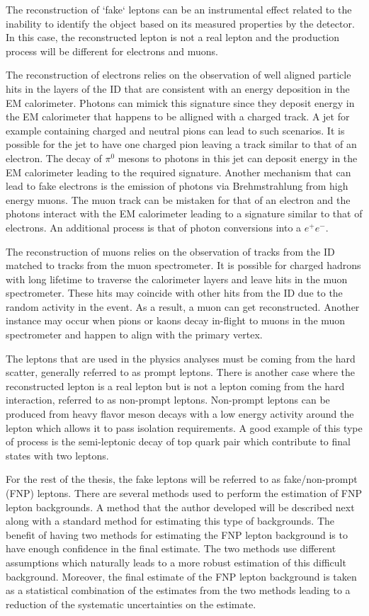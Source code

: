 The reconstruction of `fake` leptons can be an instrumental effect related to the inability to identify the object based on 
its measured properties by the detector. In this case, the reconstructed lepton is not a real lepton and the production process 
will be different for electrons and muons.

The reconstruction of electrons relies on the observation of well aligned particle hits in the layers of the ID that are consistent 
with an energy deposition in the EM calorimeter. Photons can mimick this signature since they deposit energy in the EM 
calorimeter that happens to be alligned with a charged track. A jet for example containing charged and neutral pions can 
lead to such scenarios. It is possible for the jet to have one charged pion leaving a track similar to that of an electron.
The decay of $\pi^0$ mesons to photons in this jet can deposit energy in the EM calorimeter leading to the required signature.
Another mechanism that can lead to fake electrons is the emission of photons via Brehmstrahlung from high energy muons. 
The muon track can be mistaken for that of an electron and the photons interact with the EM calorimeter leading to a
signature similar to that of electrons. An additional process is that of photon conversions into a $e^+e^-$.

The reconstruction of muons relies on the observation of tracks from the ID matched to tracks from the muon spectrometer.
It is possible for charged hadrons with long lifetime to traverse the calorimeter layers and leave hits in the muon spectrometer.
These hits may coincide with other hits from the ID due to the random activity in the event. As a result, a muon can get
reconstructed. Another instance may occur when pions or kaons decay in-flight to muons in the muon spectrometer
and happen to align with the primary vertex.

The leptons that are used in the physics analyses must be coming from the hard scatter, generally referred to as prompt leptons.
There is another case where the reconstructed lepton is a real lepton but is not a lepton coming from the hard interaction,
referred to as non-prompt leptons. Non-prompt leptons can be produced from heavy flavor meson decays with a low energy activity 
around the lepton which allows it to pass isolation requirements. A good example of this type of process is the 
semi-leptonic decay of top quark pair which contribute to final states with two leptons. 

For the rest of the thesis, the fake leptons will be referred to as fake/non-prompt (FNP) leptons.
There are several methods used to perform the estimation of FNP lepton backgrounds. 
A method that the author developed will be described next along with a standard method for estimating this type of backgrounds.
The benefit of having two methods for estimating the FNP lepton background is to have enough confidence in the final estimate. 
The two methods use different assumptions which naturally leads to a more robust estimation of this difficult background.
Moreover, the final estimate of the FNP lepton background is taken as a statistical combination of the estimates from the 
two methods leading to a reduction of the systematic uncertainties on the estimate.
